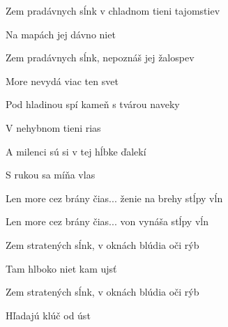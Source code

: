 \begin{song}



\begin{chordbox}
\end{chordbox}

\large

\bigskip


Zem pradávnych sĺnk v chladnom tieni tajomstiev \par
Na mapách jej dávno niet \par
Zem pradávnych sĺnk, nepoznáš jej žalospev \par
More nevydá viac ten svet \par

\bigskip

Pod hladinou spí kameň s tvárou naveky \par
{}V nehybnom tieni rias \par
A milenci sú si v tej hĺbke ďalekí \par
{}S rukou sa míňa vlas \par

\bigskip

Len more cez brány čias... ženie na brehy stĺpy vĺn \par
Len more cez brány čias... von vynáša stĺpy vĺn \par

\bigskip

 \par

\bigskip

Zem stratených sĺnk, v oknách blúdia oči rýb \par
Tam hlboko niet kam ujsť \par
Zem stratených sĺnk, v oknách blúdia oči rýb \par
{}Hľadajú klúč od úst \par


\end{song}
